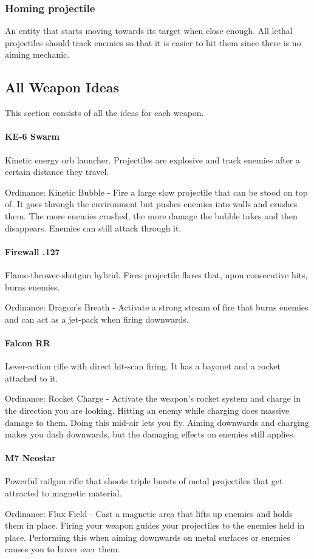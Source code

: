\documentclass[../Main.tex]{subfiles}
\begin{document}
\subsubsection{Homing projectile}

An entity that starts moving towards its target when close enough. All lethal projectiles should track enemies so that it is easier to hit them since there is no aiming mechanic.

\subsection{All Weapon Ideas}

This section consists of all the ideas for each weapon.

\paragraph{KE-6 Swarm}

Kinetic energy orb launcher. Projectiles are explosive and track enemies after a certain distance they travel. 

Ordinance: Kinetic Bubble - Fire a large slow projectile that can be stood on top of. It goes through the environment but pushes enemies into walls and crushes them. The more enemies crushed, the more damage the bubble takes and then disappears. Enemies can still attack through it.

\paragraph{Firewall .127}

Flame-thrower-shotgun hybrid. Fires projectile flares that, upon consecutive hits, burns enemies.

Ordinance: Dragon's Breath - Activate a strong stream of fire that burns enemies and can act as a jet-pack when firing downwards.

\paragraph{Falcon RR}

Lever-action rifle with direct hit-scan firing. It has a bayonet and a rocket attached to it.

Ordinance: Rocket Charge - Activate the weapon's rocket system and charge in the direction you are looking. Hitting an enemy while charging does massive damage to them. Doing this mid-air lets you fly. Aiming downwards and charging makes you dash downwards, but the damaging effects on enemies still applies.

\paragraph{M7 Neostar}

Powerful railgun rifle that shoots triple bursts of metal projectiles that get attracted to magnetic material.

Ordinance: Flux Field - Cast a magnetic area that lifts up enemies and holds them in place. Firing your weapon guides your projectiles to the enemies held in place. Performing this when aiming downwards on metal surfaces or enemies causes you to hover over them.
\end{document}
